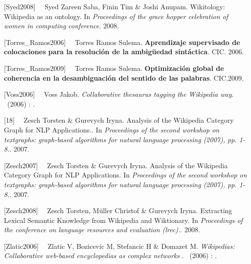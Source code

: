 \documentclass[letterpaper]{article}
\newcommand\textstylebibusindexbase[1]{#1}
\newcommand\textstylebibusindexbasei[1]{\textit{#1}}
\newcommand\textstylebibusindexbaseb[1]{\textbf{#1}}
\begin{document}
{
\textstylebibusindexbase{[Syed2008] }\ \ \textstylebibusindexbase{Syed
Zareen Saba, Finin Tim \& Joshi Anupam. Wikitology: Wikipedia as an
ontology. In }\textstylebibusindexbasei{Proceedings of the grace hopper
celebration of women in computing
}\textstylebibusindexbasei{conference}\textstylebibusindexbase{.
2008.}}

{
\textstylebibusindexbase{[Torres\_Ramos2006]
}\ \ \textstylebibusindexbase{Torres Ramos Sulema.
}\textstylebibusindexbaseb{Aprendizaje supervisado de colocaciones para
la resoluci\'on de la ambig\"uedad
sint\'actica}\textstylebibusindexbase{. CIC. 2006.}}

{
\textstylebibusindexbase{[Torres\_Ramos2009]
}\ \ \textstylebibusindexbase{Torres Ramos Sulema.
}\textstylebibusindexbaseb{Optimizaci\'on global de coherencia en la
desambiguaci\'on del sentido de las palabras}\textstylebibusindexbase{.
CIC.2009.}}

{
\textstylebibusindexbase{[Voss2006] }\ \ \textstylebibusindexbase{Voss
Jakob. }\textstylebibusindexbasei{Collaborative thesaurus tagging the
Wikipedia way}\textstylebibusindexbase{.
}\textstylebibusindexbase{\ (}\textstylebibusindexbase{2006)
}\textstylebibusindexbase{: }\textstylebibusindexbase{.}}

{
\textstylebibusindexbase{[18] }\ \ \textstylebibusindexbase{Zesch
Torsten \& Gurevych Iryna. Analysis of the Wikipedia Category Graph for
NLP Applications.. In }\textstylebibusindexbasei{Proceedings of the
second workshop on textgraphs: graph-based algorithms for natural
language processing (2007), pp. 1-8.}\textstylebibusindexbase{. 2007.}}

{
\textstylebibusindexbase{[Zesch2007] }\ \ \textstylebibusindexbase{Zesch
Torsten \& Gurevych Iryna. Analysis of the Wikipedia Category Graph for
NLP Applications. In }\textstylebibusindexbasei{Proceedings of the
second workshop on textgraphs: graph-based algorithms for natural
language processing (2007), pp. 1-8.}\textstylebibusindexbase{. 2007.}}

{
\textstylebibusindexbase{[Zesch2008] }\ \ \textstylebibusindexbase{Zesch
Torsten, M\"uller Christof \& Gurevych Iryna. Extracting Lexical
Semantic Knowledge from Wikipedia and Wiktionary. In
}\textstylebibusindexbasei{Proceedings of the conference on language
resources and evaluation (lrec).}\textstylebibusindexbase{. 2008.}}

{
\textstylebibusindexbase{[Zlatic2006]
}\ \ \textstylebibusindexbase{Zlatic V, Bozicevic M, Stefancic H \&
Domazet M. }\textstylebibusindexbasei{Wikipedias: Collaborative
web-based encyclopedias as complex networks\newline
}\textstylebibusindexbase{.
}\textstylebibusindexbase{\ (}\textstylebibusindexbase{2006)
}\textstylebibusindexbase{: }\textstylebibusindexbase{.}}

\bigskip
\end{document}
